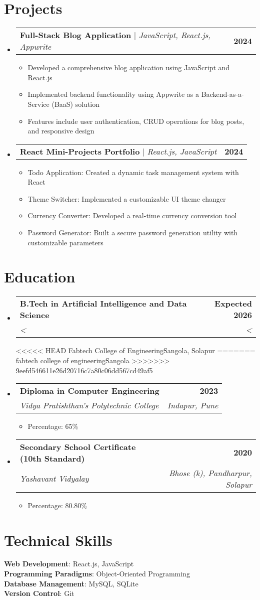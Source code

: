 \documentclass[a4paper,11pt]{article}
\makeatletter
\newcommand{\resumeItem}[1]{
  \item\small{
    {#1 \vspace{-2pt}}
  }
}
\newcommand{\resumeSubheading}[4]{
  \vspace{-2pt}\item
    \begin{tabular*}{1.0\textwidth}[t]{l@{\extracolsep{\fill}}r}
      \textbf{#1} & \textbf{\small #2} \\
      \textit{\small#3} & \textit{\small #4} \\
    \end{tabular*}\vspace{-7pt}
}
\newcommand{\resumeProjectHeading}[2]{
    \item
    \begin{tabular*}{1.001\textwidth}{l@{\extracolsep{\fill}}r}
      \small#1 & \textbf{\small #2}\\
    \end{tabular*}\vspace{-7pt}
}
\newcommand{\resumeSubHeadingListStart}{\begin{itemize}[leftmargin=0.0in, label={}]}
\newcommand{\resumeSubHeadingListEnd}{\end{itemize}}
\newcommand{\resumeItemListStart}{\begin{itemize}}
\newcommand{\resumeItemListEnd}{\end{itemize}\vspace{-5pt}}
\makeatother
\begin{document}
\section{Projects}
\resumeSubHeadingListStart
    \resumeProjectHeading
    {\textbf{Full-Stack Blog Application} $|$ \emph{JavaScript, React.js, Appwrite}}{2024}
    \resumeItemListStart
        \resumeItem{Developed a comprehensive blog application using JavaScript and React.js}
        \resumeItem{Implemented backend functionality using Appwrite as a Backend-as-a-Service (BaaS) solution}
        \resumeItem{Features include user authentication, CRUD operations for blog posts, and responsive design}
    \resumeItemListEnd
    \resumeProjectHeading
    {\textbf{React Mini-Projects Portfolio} $|$ \emph{React.js, JavaScript}}{2024}
    \resumeItemListStart
        \resumeItem{Todo Application: Created a dynamic task management system with React}
        \resumeItem{Theme Switcher: Implemented a customizable UI theme changer}
        \resumeItem{Currency Converter: Developed a real-time currency conversion tool}
        \resumeItem{Password Generator: Built a secure password generation utility with customizable parameters}
    \resumeItemListEnd
\resumeSubHeadingListEnd

\section{Education}
\resumeSubHeadingListStart
    \resumeSubheading
    {B.Tech in Artificial Intelligence and Data Science}{Expected 2026}
<<<<<<< HEAD
    {Fabtech College of Engineering}{Sangola, Solapur}
=======
    {fabtech college of engineering}{Sangola}
>>>>>>> 9eefd546611e26d20716c7a80c06dd567cd49af5
    \resumeSubheading
    {Diploma in Computer Engineering}{2023}
    {Vidya Pratishthan's Polytechnic College}{Indapur, Pune}
    \resumeItemListStart
        \resumeItem{Percentage: 65\%}
    \resumeItemListEnd
    \resumeSubheading
    {Secondary School Certificate (10th Standard)}{2020}
    {Yashavant Vidyalay}{Bhose (k), Pandharpur, Solapur}
    \resumeItemListStart
        \resumeItem{Percentage: 80.80\%}
    \resumeItemListEnd
\resumeSubHeadingListEnd

\section{Technical Skills}
\begin{itemize}[leftmargin=0.15in, label={}]
    \small{\item{
    \textbf{Web Development}{: React.js, JavaScript} \\
    \textbf{Programming Paradigms}{: Object-Oriented Programming} \\
    \textbf{Database Management}{: MySQL, SQLite} \\
    \textbf{Version Control}{: Git}
    }}
\end{itemize}
\end{document}
